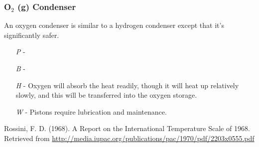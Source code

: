 \documentclass[a4paper]{article}
\begin{document}
\vspace{-0.5cm} \hspace{-18pt} \subsubsection{O$_2$ (g) Condenser} \label{engine_o2_condenser} \vspace{-0.2cm}
An oxygen condenser is similar to a hydrogen condenser except that it's significantly safer.
\begin{enumerate}
\item [\textit{P}] -  \\
\item [\textit{B}] -  \\
\item [\textit{H}] - Oxygen will absorb the heat readily, though it will heat up relatively slowly, and this will be transferred into the oxygen storage.
\item [\textit{W}] - Pistons require lubrication and maintenance.
\end{enumerate}

\newpage
\begin{thebibliography}{0}
Rossini, F. D. (1968). A Report on the International Temperature Scale of 1968. Retrieved from \url{http://media.iupac.org/publications/pac/1970/pdf/2203x0555.pdf}
\end{thebibliography}
\end{document}
